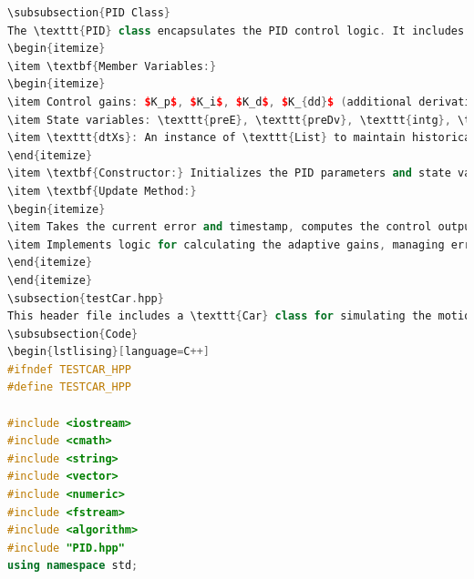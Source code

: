 \documentclass[a4paper,12pt]{article}
\begin{document}
\begin{lstlisting}[language=C++]
\subsubsection{PID Class}
The \texttt{PID} class encapsulates the PID control logic. It includes:
\begin{itemize}
\item \textbf{Member Variables:}
\begin{itemize}
\item Control gains: $K_p$, $K_i$, $K_d$, $K_{dd}$ (additional derivative term).
\item State variables: \texttt{preE}, \texttt{preDv}, \texttt{intg}, \texttt{preOut}, and \texttt{preT}, which store the previous error, derivative, integral term, last output, and last timestamp, respectively.
\item \texttt{dtXs}: An instance of \texttt{List} to maintain historical error data.
\end{itemize}
\item \textbf{Constructor:} Initializes the PID parameters and state variables.
\item \textbf{Update Method:}
\begin{itemize}
\item Takes the current error and timestamp, computes the control output, and updates the internal state.
\item Implements logic for calculating the adaptive gains, managing error history, and generating the control signal.
\end{itemize}
\end{itemize}
\subsection{testCar.hpp}
This header file includes a \texttt{Car} class for simulating the motion of a car, a PID controller for adjusting the speed of an auto-following kart based on the distance to a leader car, and several utility functions for data processing and results management.
\subsubsection{Code}
\begin{lstlising}[language=C++]
#ifndef TESTCAR_HPP
#define TESTCAR_HPP

#include <iostream>
#include <cmath>
#include <string>
#include <vector>
#include <numeric>
#include <fstream>
#include <algorithm>
#include "PID.hpp"
using namespace std;


\end{lstlisting}
\end{document}
